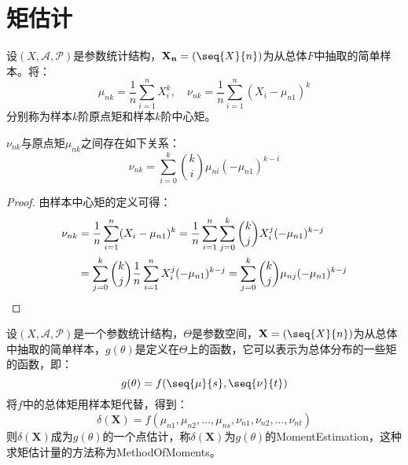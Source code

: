 \section{矩估计}

\begin{definition}
	设$(X,\mathscr{A},\mathscr{P})$是参数统计结构，$\mathbf{X_n}=(\seq{X}{n})$为从总体$F$中抽取的简单样本。将：
	\begin{equation*}
		\mu_{nk}=\frac{1}{n}\sum_{i=1}^{n}X_i^k,\quad
		\nu_{nk}=\frac{1}{n}\sum_{i=1}^{n}(X_i-\mu_{n1})^k
	\end{equation*}
	分别称为样本$k$阶原点矩和样本$k$阶中心矩。
\end{definition}
\begin{theorem}\label{theo:SampleMoment}
	$\nu_{nk}$与原点矩$\mu_{nk}$之间存在如下关系：
	\begin{equation*}
		\nu_{nk}=\sum_{i=0}^{k}\binom{k}{i}\mu_{ni}(-\mu_{n1})^{k-i}
	\end{equation*}
\end{theorem}
\begin{proof}
	由样本中心矩的定义可得：
	\begin{align*}
		\nu_{nk}
		&=\frac{1}{n}\sum_{i=1}^{n}(X_i-\mu_{n1})^k
		=\frac{1}{n}\sum_{i=1}^{n}\sum_{j=0}^{k}\binom{k}{j}X_i^j(-\mu_{n1})^{k-j} \\
		&=\sum_{j=0}^{k}\binom{k}{j}\frac{1}{n}\sum_{i=1}^{n}X_i^j(-\mu_{n1})^{k-j}
		=\sum_{j=0}^{k}\binom{k}{j}\mu_{nj}(-\mu_{n1})^{k-j}\qedhere
	\end{align*}
\end{proof}
\begin{definition}
	设$(X,\mathscr{A},\mathscr{P})$是一个参数统计结构，$\Theta$是参数空间，$\mathbf{X}=(\seq{X}{n})$为从总体中抽取的简单样本，$g(\theta)$是定义在$\Theta$上的函数，它可以表示为总体分布的一些矩的函数，即：
	\begin{equation*}
		g(\theta)=f(\seq{\mu}{s},\seq{\nu}{t})
	\end{equation*}
	将$f$中的总体矩用样本矩代替，得到：
	\begin{equation*}
		\delta(\mathbf{X})=f(\mu_{n1},\mu_{n2},\dots,\mu_{ns},\nu_{n1},\nu_{n2},\dots,\nu_{nt})
	\end{equation*}
	则$\delta(\mathbf{X})$成为$g(\theta)$的一个点估计，称$\delta(\mathbf{X})$为$g(\theta)$的\gls{MomentEstimation}，这种求矩估计量的方法称为\gls{MethodOfMoments}。
\end{definition}
